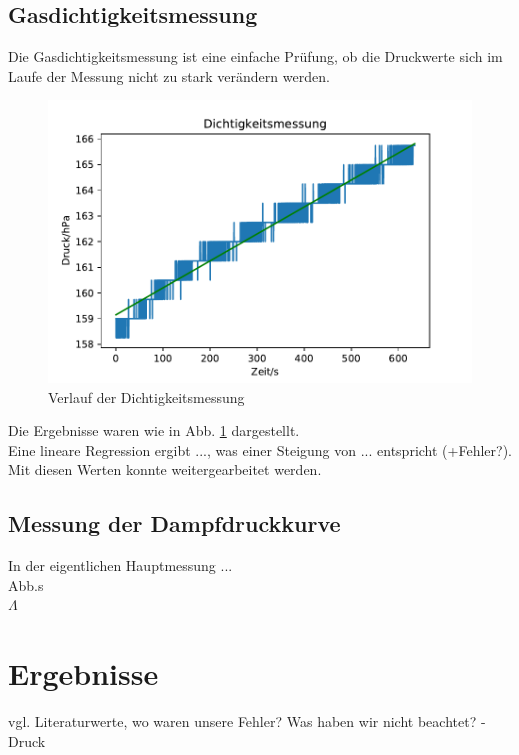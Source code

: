 \documentclass[]{article}
\begin{document}
\subsection{Gasdichtigkeitsmessung}
Die Gasdichtigkeitsmessung ist eine einfache Prüfung, ob die Druckwerte sich im Laufe der Messung nicht zu stark verändern werden.\\
\begin{figure}
	\begin{center}
		\includegraphics[scale=0.9]{Images/Kalib_Dichtigkeitsmessung.pdf}
		\caption{Verlauf der Dichtigkeitsmessung}
		\label{GD_data}
	\end{center}
\end{figure}
Die Ergebnisse waren wie in Abb. \ref{GD_data} dargestellt. \\
Eine lineare Regression ergibt ..., was einer Steigung von ... entspricht (+Fehler?). Mit diesen Werten konnte weitergearbeitet werden.
\subsection{Messung der Dampfdruckkurve}
In der eigentlichen Hauptmessung ...\\
Abb.s\\
$\Lambda$\\ 
\section{Ergebnisse}
vgl. Literaturwerte, wo waren unsere Fehler? Was haben wir nicht beachtet? - Druck
\end{document}
